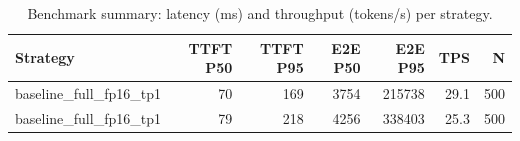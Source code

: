 \begin{table}
\caption{Benchmark summary: latency (ms) and throughput (tokens/s) per strategy.}
\label{tab:summary}
\begin{tabular}{lrrrrrr}
\toprule
Strategy & TTFT P50 & TTFT P95 & E2E P50 & E2E P95 & TPS & N \\
\midrule
baseline_full_fp16_tp1 & 70 & 169 & 3754 & 215738 & 29.1 & 500 \\
baseline_full_fp16_tp1 & 79 & 218 & 4256 & 338403 & 25.3 & 500 \\
\bottomrule
\end{tabular}
\end{table}
